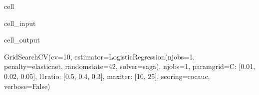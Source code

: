 \documentclass[letterpaper,10pt,english]{jupyterBook}
\begin{document}
\begin{sphinxuseclass}{cell}
\begin{sphinxVerbatimInput}
\begin{sphinxuseclass}{cell_input}
\end{sphinxuseclass}\end{sphinxVerbatimInput}
\begin{sphinxVerbatimOutput}

\begin{sphinxuseclass}{cell_output}
\begin{sphinxVerbatim}[commandchars=\\\{\}]
GridSearchCV(cv=10,
             estimator=LogisticRegression(n\PYGZus{}jobs=\PYGZhy{}1, penalty=\PYGZsq{}elasticnet\PYGZsq{},
                                          random\PYGZus{}state=42, solver=\PYGZsq{}saga\PYGZsq{}),
             n\PYGZus{}jobs=\PYGZhy{}1,
             param\PYGZus{}grid=\PYGZob{}\PYGZsq{}C\PYGZsq{}: [0.01, 0.02, 0.05], \PYGZsq{}l1\PYGZus{}ratio\PYGZsq{}: [0.5, 0.4, 0.3],
                         \PYGZsq{}max\PYGZus{}iter\PYGZsq{}: [10, 25]\PYGZcb{},
             scoring=\PYGZsq{}roc\PYGZus{}auc\PYGZsq{}, verbose=False)
\end{sphinxVerbatim}

\end{sphinxuseclass}\end{sphinxVerbatimOutput}

\end{sphinxuseclass}
\end{document}
